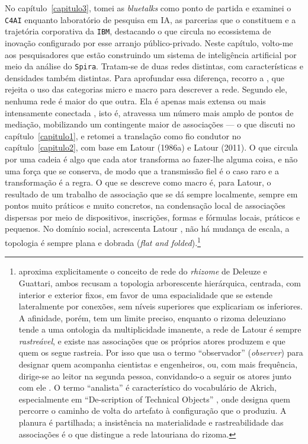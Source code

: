 No capítulo~\ref{capitulo3}, tomei as \textit{bluetalks} como ponto de partida e examinei o \texttt{C4AI} enquanto laboratório de pesquisa em IA, as parcerias que o constituem e a trajetória corporativa da \texttt{IBM}, destacando o que circula no ecossistema de inovação configurado por esse arranjo público-privado. Neste capítulo, volto-me aos pesquisadores que estão construindo um sistema de inteligência artificial por meio da análise do \texttt{Spira}. Tratam-se de duas redes distintas, com características e densidades também distintas. Para aprofundar essa diferença, recorro a \textcite{latour1996clarifications, Latour1999RecallingANT}, que rejeita o uso das categorias micro e macro para descrever a rede. Segundo ele, nenhuma rede é maior do que outra. Ela é apenas mais extensa ou mais intensamente conectada \parencite[p.~5]{latour1996clarifications}, isto é, atravessa um número mais amplo de pontos de mediação, mobilizando um contingente maior de associações --- o que discuti no capítulo~\ref{capitulo1}, e retomei a translação como fio condutor no capítulo~\ref{capitulo2}, com base em Latour (1986a) e Latour (2011). O que circula por uma cadeia é algo que cada ator transforma ao fazer-lhe alguma coisa, e não uma força que se conserva, de modo que a transmissão fiel é o caso raro e a transformação é a regra. O que se descreve como macro é, para Latour, o resultado de um trabalho de associação que se dá sempre localmente, sempre em pontos muito práticos e muito concretos, na condensação local de associações dispersas por meio de dispositivos, inscrições, formas e fórmulas locais, práticos e pequenos. No domínio social, acrescenta Latour \parencite[p.~17]{Latour1999RecallingANT}, não há mudança de escala, a topologia é sempre plana e dobrada (\textit{flat and folded}).\footnote{\textcite{latour1996clarifications} aproxima explicitamente o conceito de rede do \textit{rhizome} de Deleuze e Guattari, ambos recusam a topologia arborescente hierárquica, centrada, com interior e exterior fixos, em favor de uma espacialidade que se estende lateralmente por conexões, sem níveis superiores que explicariam os inferiores. A afinidade, porém, tem um limite preciso, enquanto o rizoma deleuziano tende a uma ontologia da multiplicidade imanente, a rede de Latour é sempre \textit{rastreável}, e existe nas associações que os próprios atores produzem e que quem os segue rastreia. Por isso que \textcite{Latour2011CienciaEmAcao} usa o termo \enquote{observador} (\textit{observer}) para designar quem acompanha cientistas e engenheiros, ou, com mais frequência, dirige-se ao leitor na segunda pessoa, convidando-o a seguir os atores junto com ele \parencite{Latour2011CienciaEmAcao}. O termo \enquote{analista} é característico do vocabulário de Akrich, especialmente em \enquote{De-scription of Technical Objects} \parencite{Akrich1992Description}, onde designa quem percorre o caminho de volta do artefato à configuração que o produziu. A planura é partilhada; a insistência na materialidade e rastreabilidade das associações é o que distingue a rede latouriana do rizoma.}

